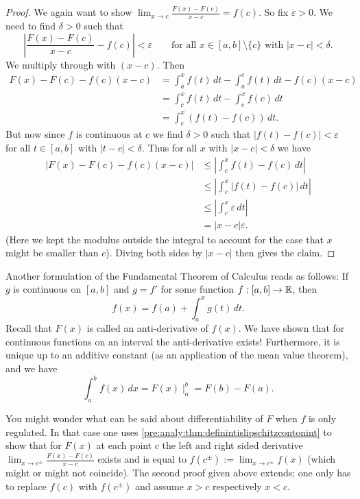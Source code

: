 \documentclass[10pt, a4paper]{article}
\begin{document}
\begin{theorem}
\begin{proof}
        We again want to show $\lim_{x \rightarrow c}\frac{F(x) - F(c)}{x - c} = f(c)$.
        So fix $\varepsilon > 0$.
        We need to find $\delta > 0$ such that
        \[
        \left|\frac{F(x) - F(c)}{x - c} - f(c)\right| < \varepsilon\qquad\text{for all } x \in [a, b] \setminus \{c\}\text{ with } |x - c| < \delta.
        \]
        We multiply through with $(x - c)$.
        Then
        \begin{align*}
            F(x) - F(c) - f(c)(x - c) &= \int_{a}^{x}f(t)\,dt - \int_{a}^{c}f(t)\,dt - f(c)(x - c) \\
            &= \int_{c}^{x}f(t)\,dt - \int_{c}^{x}f(c)\,dt \\
            &= \int_{c}^{x}(f(t) - f(c))\,dt.
        \end{align*}
        But now since $f$ is continuous at $c$ we find $\delta > 0$ such that $|f(t) - f(c)| < \varepsilon$ for all $t \in [a, b]$ with $|t - c| < \delta$.
        Thus for all $x$ with $|x - c| < \delta$ we have
        \begin{align*}
            |F(x) - F(c) - f(c)(x - c)| &\leq \left|\int_{c}^{x}f(t) - f(c)\,dt\right| \\
            &\leq\left|\int_{c}^{x}|f(t) - f(c)|\,dt\right| \\
            &\leq\left|\int_{c}^{x}\varepsilon\,dt\right| \\
            &= |x - c|\varepsilon.
        \end{align*}
        (Here we kept the modulus outside the integral to account for the case that $x$ might be smaller than $c$).
        Diving both sides by $|x - c|$ then gives the claim.
    \end{proof}
\end{theorem}

Another formulation of the Fundamental Theorem of Calculus reads as follows:
If $g$ is continuous on $[a, b]$ and $g = f'$ for some function $f : [a, b] \rightarrow \mathbb{R}$,
then
\[
f(x) = f(a) + \int_{a}^{x}g(t)\,dt.
\]
Recall that $F(x)$ is called an anti-derivative of $f(x)$.
We have shown that for continuous functions on an interval the anti-derivative exists!
Furthermore,
it is unique up to an additive constant
(as an application of the mean value theorem),
and we have
\[
\int_{a}^{b}f(x)\,dx = F(x)\mid_{a}^{b} = F(b) - F(a).
\]

\begin{remark}
    You might wonder what can be said about differentiability of $F$ when $f$ is only regulated.
    In that case one uses \autoref{pre:analy:thm:definintislipschitzcontonint} to show that for $F(x)$ at each point $c$ the left and right sided derivative $\lim_{x \rightarrow c ^ {\pm}}\frac{F(x) - F(c)}{x - c}$ exists and is equal to $f(c ^ {\pm}) := \lim_{x \rightarrow c ^ {\pm}}f(x)$
    (which might or might not coincide).
    The second proof given above extends;
    one only has to replace $f(c)$ with $f(c ^ {\pm})$ and assume $x > c$ respectively $x < c$.
\end{remark}
\end{document}
